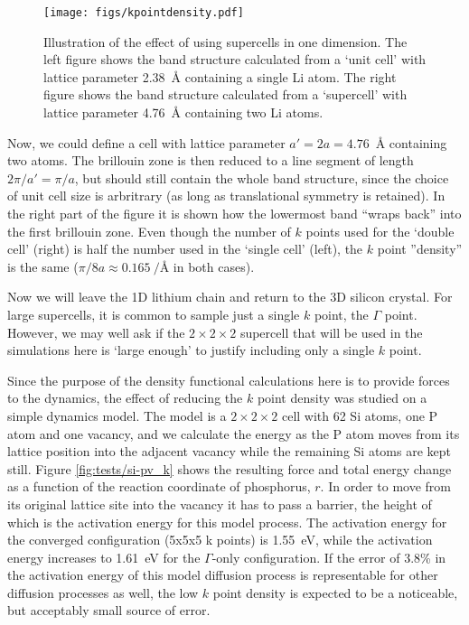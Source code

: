 \documentclass[11pt,bibliography=totoc,index=totoc]{scrbook}   %
\begin{document}
\begin{figure}[htp]
  \centering
  \texttt{[image: figs/kpointdensity.pdf]}
  \caption{Illustration of the effect of using supercells in one dimension. 
  The left figure shows the band structure calculated from a `unit cell' with
  lattice parameter 2.38~Å containing a single Li atom.
  The right figure shows the band structure calculated from a `supercell' with
  lattice parameter 4.76~Å containing two Li atoms.}
  \label{fig:kpointdensities}
\end{figure}

Now, we could define a
cell with lattice parameter $a'=2a=4.76$~Å containing two atoms. 
The brillouin zone is then reduced to a line segment of length $2\pi/a'=\pi/a$,
but should still contain the whole band structure, since the choice of unit cell size is arbritrary (as long as translational symmetry is retained).
In the right part of the figure it is shown how the lowermost band ``wraps back'' into the first brillouin zone.
Even though the number of $k$ points used for the `double cell' (right) is half the number used in the `single cell' (left), the $k$ point ''density'' is the same
($\pi/8a\approx\SI{0.165}{\per\angstrom}$ in both cases).

Now we will leave the 1D lithium chain and return to the 3D silicon crystal. For large supercells, it is common to sample just a single $k$ point, the $\Gamma$ point. 
However, we may well ask if the $2\times 2\times 2$ supercell that will be used in the simulations here is `large enough' to justify including only a single $k$ point.

Since the purpose of the density functional calculations here is to provide forces to the dynamics, the effect of reducing the $k$ point density was studied on a simple dynamics model.
The model is a $2\times 2\times 2$ cell with 62 Si atoms, one P atom and one vacancy, and we calculate the energy as the P atom moves from its lattice position into the adjacent vacancy while the remaining Si atoms are kept still. 
Figure \ref{fig:tests/si-pv_k} shows the resulting force and total energy change as a function of the reaction coordinate of phosphorus, $r$. 
In order to move from its original lattice site into the vacancy it has to pass a barrier, the height of which is the activation energy for this model process.
The activation energy for the converged configuration (5x5x5 k points) is 1.55~eV, while the activation energy increases to 1.61~eV for the $\Gamma$-only configuration.
If the error of 3.8\% in the activation energy of this model diffusion process is representable for other diffusion processes as well, 
the low $k$ point density is expected to be a noticeable, but acceptably small source of error.
\end{document}
